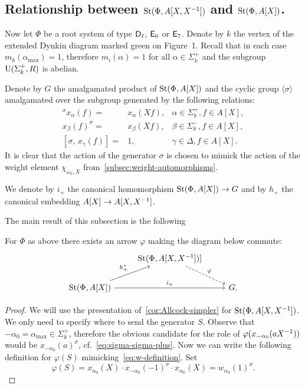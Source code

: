 \subsection{Relationship between $\operatorname{St}(\Phi, A[X, X^{-1}])$ and $\operatorname{St}(\Phi, A[X])$.} \label{subsec:short-presentation}
Now let $\Phi$ be a root system of type $\mathsf{D}_\ell$, $\mathsf{E}_6$ or $\mathsf{E}_7$.
Denote by $k$ the vertex of the extended Dynkin diagram marked green on Figure~1.
Recall that in each case $m_k(\alpha_\mathrm{\max}) = 1$, therefore $m_i(\alpha) = 1$ for all $\alpha \in \Sigma_k^+$ and the subgroup $\operatorname{U}(\Sigma^+_k, R)$ is abelian.

Denote by $G$ the amalgamated product of $\operatorname{St}(\Phi, A[X])$ and the cyclic group $\langle \sigma \rangle$ amalgamated over the subgroup generated by the following relations:
\begin{align}
    {}^\sigma x_{\alpha}(f) = & x_{\alpha} (Xf), & \alpha \in \Sigma^+_k, f \in A[X], \label{eq:sigma-sigma-plus} \\
    x_{\beta}(f)^ \sigma     =& x_{\beta} (Xf), & \beta \in \Sigma^-_k, f \in A[X], \label{eq:sigma-sigma-minus} \\
    [\sigma,\, x_\gamma(f)]   =& 1, & \gamma \in \Delta, f \in A[X]. \label{eq:sigma-delta}
\end{align}
It is clear that the action of the generator $\sigma$ is chosen to mimick the action of the weight element $\chi_{\omega_k, X}$ from~\cref{subsec:weight-automorphisms}.

We denote by $i_+$ the canonical homomorphism $\operatorname{St}(\Phi, A[X]) \to G$ and by $h_+$ the canonical embedding $A[X] \to A[X, X^{-1}]$.

The main result of this subsection is the following
\begin{prop}
    For $\Phi$ as above there exists an arrow $\varphi$ making the diagram below commute:
    \[\begin{tikzcd}           & \St(\Phi, A[X, X\inv]) \arrow[rd, dashrightarrow, "\varphi"]] & \\
    \St(\Phi, A[X]) \arrow{ru}{h_+^*} \arrow{rr}{i_+} &                                & G.
    \end{tikzcd}\]
\end{prop}
\begin{proof}
 We will use the presentation of~\cref{cor:Allcock-simpler} for $\operatorname{St}(\Phi, A[X, X^{-1}])$.
 We only need to specify where to send the generator $S$.
 Observe that $-\alpha_0 = \alpha_{\max} \in \Sigma_k^+$, therefore the obvious candidate for the role of $\varphi(x_{-\alpha_0}(aX^{-1}))$ would be $x_{-\alpha_0}(a)^\sigma$, cf.~\eqref{eq:sigma-sigma-plus}.
 Now we can write the following definition for $\varphi(S)$ mimicking~\eqref{eq:w-definition}.
 Set \[\varphi(S) = x_{\alpha_0}(X) \cdot x_{-\alpha_0}(-1)^\sigma \cdot x_{\alpha_0}(X) = w_{\alpha_0}(1)^\sigma.\]
\end{proof}